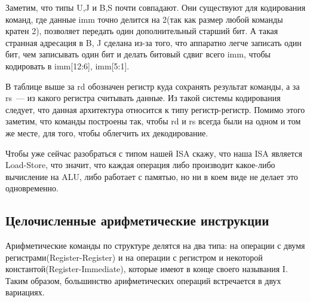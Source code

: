 \documentclass[14pt, russian, onesize]{extreport}
\begin{document}
Заметим, что типы U,J и B,S почти совпадают. Они существуют для кодирования
команд, где данные imm точно делится на 2(так как размер любой команды кратен 2),
позволяет передать один дополнительный старший бит. 
А такая странная адресация в B, J сделана из-за того, что аппаратно легче 
записать один бит, чем записывать один бит и делать битовый сдвиг всего imm,
чтобы кодировать в imm[12:6], imm[5:1].

В таблице выше за rd обозначен регистр
куда сохранять результат команды, а за rs~--- из какого регистра считывать данные.
Из такой системы  кодирования следует,
что данная архитектура относится к типу регистр-регистр. 
Помимо этого заметим, что команды построены так, чтобы rd и rs всегда
были на одном и том же месте, для того, чтобы облегчить их декодирование.

Чтобы уже сейчас разобраться с типом нашей ISA скажу, что наша ISA 
является Load-Store, что значит, что каждая операция либо производит
какое-либо вычисление на ALU, либо работает с памятью, но ни в коем
виде не делает это одновременно.

\subsection*{Целочисленные арифметические инструкции}
Арифметические команды по структуре делятся на два типа: на операции
с двумя регистрами(Register-Register) и на операции с регистром и некоторой 
константой(Register-Immediate), которые имеют в конце своего называния I. Таким 
образом, большинство арифметических операций встречается в двух вариациях. 
\end{document}
